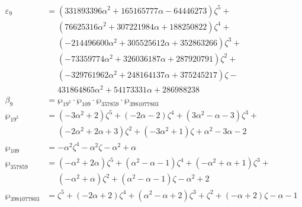 \documentclass[12pt]{amsart}
\theoremstyle{definition}
\def\a{\alpha}
\def\z{\zeta}
\def\z{\zeta}
\begin{document}
{\small
\begin{align*}
\varepsilon_{9} &= 
(331893396 \a^2 + 165165777 \a - 64446273) \z^5 + 
\\ & \quad\,\,
(76625316 \a^2 + 307221984 \a + 188250822) \z^4 + 
\\ & \quad\,\,
(-214496600 \a^2 + 305525612 \a + 352863266) \z^3 + 
\\ & \quad\,\,
(-73359774 \a^2 + 326036187 \a + 287920791) \z^2 + 
\\ & \quad\,\,
(-329761962 \a^2 + 248164137 \a + 375245217) \z - 
\\ & \quad\,\,
431864865 \a^2 + 54173331 \a + 286988238
\\
\beta_{9} &= \wp_{19^2} \cdot \wp_{109} \cdot \wp_{357859}
\cdot \wp_{3981077803} \\
\wp_{19^2} &=
(-3 \a^2 + 2) \z^5 + (-2 \a - 2) \z^4 + (3 \a^2 - \a - 3) \z^3 + 
\\ & \quad\,\,
(-2 \a^2 + 2 \a + 3) \z^2 + (-3 \a^2 + 1) \z + \a^2 - 3 \a - 2
\\
\wp_{109} &= -\a^2 \z^4 - \a^2 \z - \a^2 + \a
\\
\wp_{357859} &=
(-\a^2 + 2 \a) \z^5 + (\a^2 - \a - 1) \z^4 + (-\a^2 + \a + 1) \z^3 + 
\\ & \quad\,\,
(-\a^2 + \a) \z^2 + (\a^2 - \a - 1) \z - \a^2 + 2
\\
\wp_{3981077803} &=
\z^5 + (-2 \a + 2) \z^4 + (\a^2 - \a + 2) \z^3 + \z^2 + (-\a + 2) \z - \a - 1
\end{align*}
}
\end{document}
